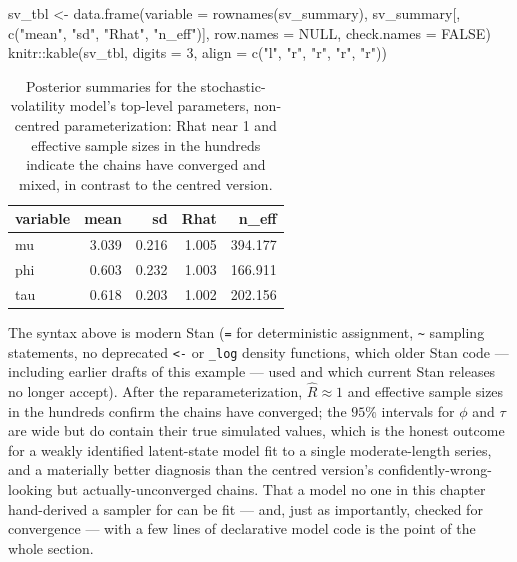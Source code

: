 \documentclass[
  letterpaper,
  DIV=11,
  numbers=noendperiod]{scrreprt}
\newenvironment{Shaded}{\begin{snugshade}}{\end{snugshade}}
\newcommand{\AttributeTok}[1]{\textcolor[rgb]{0.40,0.45,0.13}{#1}}
\newcommand{\ConstantTok}[1]{\textcolor[rgb]{0.56,0.35,0.01}{#1}}
\newcommand{\DecValTok}[1]{\textcolor[rgb]{0.68,0.00,0.00}{#1}}
\newcommand{\FunctionTok}[1]{\textcolor[rgb]{0.28,0.35,0.67}{#1}}
\newcommand{\NormalTok}[1]{\textcolor[rgb]{0.00,0.23,0.31}{#1}}
\newcommand{\OtherTok}[1]{\textcolor[rgb]{0.00,0.23,0.31}{#1}}
\newcommand{\SpecialCharTok}[1]{\textcolor[rgb]{0.37,0.37,0.37}{#1}}
\newcommand{\StringTok}[1]{\textcolor[rgb]{0.13,0.47,0.30}{#1}}
\begin{document}
\begin{Shaded}
\begin{Highlighting}[]
\NormalTok{sv\_tbl }\OtherTok{\textless{}{-}} \FunctionTok{data.frame}\NormalTok{(}\AttributeTok{variable =} \FunctionTok{rownames}\NormalTok{(sv\_summary), sv\_summary[, }\FunctionTok{c}\NormalTok{(}\StringTok{"mean"}\NormalTok{, }\StringTok{"sd"}\NormalTok{, }\StringTok{"Rhat"}\NormalTok{, }\StringTok{"n\_eff"}\NormalTok{)],}
                      \AttributeTok{row.names =} \ConstantTok{NULL}\NormalTok{, }\AttributeTok{check.names =} \ConstantTok{FALSE}\NormalTok{)}
\NormalTok{knitr}\SpecialCharTok{::}\FunctionTok{kable}\NormalTok{(sv\_tbl, }\AttributeTok{digits =} \DecValTok{3}\NormalTok{, }\AttributeTok{align =} \FunctionTok{c}\NormalTok{(}\StringTok{"l"}\NormalTok{, }\StringTok{"r"}\NormalTok{, }\StringTok{"r"}\NormalTok{, }\StringTok{"r"}\NormalTok{, }\StringTok{"r"}\NormalTok{))}
\end{Highlighting}
\end{Shaded}

{

\begin{longtable}[]{@{}lrrrr@{}}

\caption{\label{tbl-stan-sv}Posterior summaries for the
stochastic-volatility model's top-level parameters, non-centred
parameterization: Rhat near 1 and effective sample sizes in the hundreds
indicate the chains have converged and mixed, in contrast to the centred
version.}

\tabularnewline

\toprule\noalign{}
variable & mean & sd & Rhat & n\_eff \\
\midrule\noalign{}
\endhead
\bottomrule\noalign{}
\endlastfoot
mu & 3.039 & 0.216 & 1.005 & 394.177 \\
phi & 0.603 & 0.232 & 1.003 & 166.911 \\
tau & 0.618 & 0.203 & 1.002 & 202.156 \\

\end{longtable}

}

The syntax above is modern Stan (\texttt{=} for deterministic
assignment, \texttt{\textasciitilde{}} sampling statements, no
deprecated \texttt{\textless{}-} or \texttt{\_log} density functions,
which older Stan code --- including earlier drafts of this example ---
used and which current Stan releases no longer accept). After the
reparameterization, \(\hat R \approx 1\) and effective sample sizes in
the hundreds confirm the chains have converged; the \(95\%\) intervals
for \(\phi\) and \(\tau\) are wide but do contain their true simulated
values, which is the honest outcome for a weakly identified latent-state
model fit to a single moderate-length series, and a materially better
diagnosis than the centred version's confidently-wrong-looking but
actually-unconverged chains. That a model no one in this chapter
hand-derived a sampler for can be fit --- and, just as importantly,
checked for convergence --- with a few lines of declarative model code
is the point of the whole section.
\end{document}
